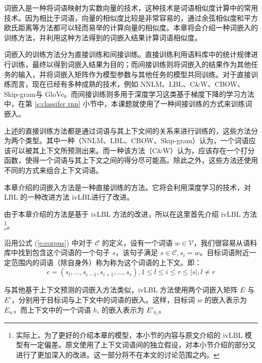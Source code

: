 
词嵌入是一种将词语映射为实数向量的技术，这种技术是词语相似度计算中的常用技术。因为相比于词语，向量的相似度比较是非常容易的，通过余弦相似度和平方欧氏距离等方法都可以轻而易举的计算向量的相似度。本章将会介绍一种词嵌入的训练方法，并利用这种方法得到的词嵌入结果计算词语相似度。

词嵌入的训练方法分为直接训练和间接训练。直接训练利用语料库中的统计规律进行训练，最终以得到词嵌入结果为目的；而间接训练则将词嵌入的结果作为其他任务的输入，并将词嵌入矩阵作为模型参数与其他任务的模型共同训练。对于直接训练而言，现在已经有多种成熟的技术，例如 NNLM、LBL、C\&W、CBOW、Skip-gram与 GloVe。而间接训练则多用于深度学习这类基于梯度下降的学习方法中，在第 \ref{s:classifer rnn} 小节中，本课题就使用了一种间接训练的方式来训练词嵌入。

上述的直接训练方法都是通过词语与其上下文间的关系来进行训练的，这些方法分为两个类型。其中一种（NNLM、LBL、CBOW、Skip-gram）认为，一个词语应该可以被其上下文所预测出来。而一种该方法（C\&W）认为，应该存在一个打分函数，使得一个词语与其上下文之间的得分尽可能高。除此之外，这些方法还使用不同的方式来组合上下文词语。

本章介绍的词嵌入方法是一种直接训练的方法。它将会利用深度学习的技术，对 LBL 的一种改进方法 ivLBL进行了改进。

\label{s:ivlbl}
由于本章介绍的方法是基于 ivLBL 方法的改进，所以在这里首先介绍 ivLBL 方法\footnote{实际上，为了更好的介绍本章的模型，本小节的内容与原文介绍的 ivLBL 模型有一定偏差。原文使用了上下文词语间的独立假设，对本小节介绍的部分又进行了更加深入的改进。这一部分将不在本文的讨论范围之内。}。

沿用公式 (\ref{e:corpus}) 中对于 $\mathcal{C}$ 的定义，设有一个词语 $w \in \mathcal{V}$，我们很容易从语料库中找到包含这个词语的一个句子 $s$，该句子满足 $s \in \mathcal{C}, s_i = w$。目标词语附近一定范围内的词语（除自身外）称为称为这个词语的上下文。即：
\begin{equation}
c = (s_l, \dots, s_{i - 1}, s_{i + 1}, \dots, s_r), 1 \leq l \leq i \leq r \leq |s|, l \neq r
\end{equation}

与其他基于上下文预测的词嵌入方法类似，ivLBL 方法使用两个词嵌入矩阵 $E$ 与 $E'$，分别用于目标词与上下文中的词语的嵌入。这样，目标词 $w$ 的嵌入表示为 $E_w$，而上下文中的一个词语 $h_i$ 的嵌入表示为 $E'_{h_i}$。

